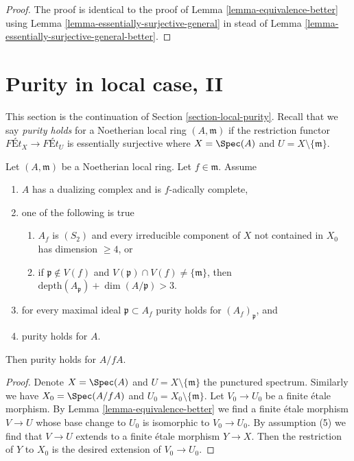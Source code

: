 \begin{proof}
The proof is identical to the proof of
Lemma \ref{lemma-equivalence-better}
using
Lemma \ref{lemma-essentially-surjective-general}
in stead of
Lemma \ref{lemma-essentially-surjective-general-better}.
\end{proof}



\section{Purity in local case, II}
\label{section-local-purity-II}

\noindent
This section is the continuation of Section \ref{section-local-purity}.
Recall that we say {\it purity holds} for a Noetherian local ring
$(A, \mathfrak m)$ if the restriction functor
$\textit{F\'Et}_X \to \textit{F\'Et}_U$ is essentially
surjective where $X = \Spec(A)$ and $U = X \setminus \{\mathfrak m\}$.

\begin{lemma}
\label{lemma-purity-inherited-by-hypersurface-better}
Let $(A, \mathfrak m)$ be a Noetherian local ring.
Let $f \in \mathfrak m$. Assume
\begin{enumerate}
\item $A$ has a dualizing complex and is $f$-adically complete,
\item one of the following is true
\begin{enumerate}
\item $A_f$ is $(S_2)$ and every irreducible component of $X$
not contained in $X_0$ has dimension $\geq 4$, or
\item if $\mathfrak p \not \in V(f)$ and
$V(\mathfrak p) \cap V(f) \not = \{\mathfrak m\}$, then
$\text{depth}(A_\mathfrak p) + \dim(A/\mathfrak p) > 3$.
\end{enumerate}
\item for every maximal ideal $\mathfrak p \subset A_f$
purity holds for $(A_f)_\mathfrak p$, and
\item purity holds for $A$.
\end{enumerate}
Then purity holds for $A/fA$.
\end{lemma}

\begin{proof}
Denote $X = \Spec(A)$ and $U = X \setminus \{\mathfrak m\}$
the punctured spectrum. Similarly we have $X_0 = \Spec(A/fA)$
and $U_0 = X_0 \setminus \{\mathfrak m\}$.
Let $V_0 \to U_0$ be a finite \'etale morphism. By
Lemma \ref{lemma-equivalence-better}
we find a finite \'etale morphism $V \to U$
whose base change to $U_0$
is isomorphic to $V_0 \to U_0$.
By assumption (5) we find that $V \to U$ extends
to a finite \'etale morphism $Y \to X$. Then the restriction of
$Y$ to $X_0$ is the desired extension of $V_0 \to U_0$.
\end{proof}

